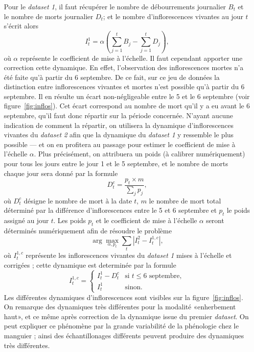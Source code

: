 Pour le \emph{dataset 1}, il faut récupérer le nombre de débourrements journalier $B_t$ et le nombre de morts journalier $D_t$; et le nombre d'inflorescences vivantes au jour $t$ s'écrit alors
\[
I_t^1 = \alpha\left( \sum_{j=1}^{t} B_j - \sum_{j=1}^{t} D_j \right),
\]
où $\alpha$ représente le coefficient de mise à l'échelle.
Il faut cependant apporter une correction cette dynamique.
En effet, l'observation des inflorescences mortes n'a été faite qu'à partir du 6 septembre.
De ce fait, sur ce jeu de données la distinction entre inflorescences vivantes et mortes n'est possible qu'à partir du 6 septembre.
Il en résulte un écart non-négligeable entre le 5 et le 6 septembre (voir figure~\ref{fig:inflos}).
Cet écart correspond au nombre de mort qu'il y a eu avant le 6 septembre, qu'il faut donc répartir sur la période concernée.
N'ayant aucune indication de comment la répartir, on utilisera la dynamique d'inflorescences vivantes du \emph{dataset 2} afin que la dynamique du \emph{dataset 1} y ressemble le plus possible --- et on en profitera au passage pour estimer le coefficient de mise à l'échelle $\alpha$.
Plus précisément, on attribuera un poids (à calibrer numériquement) pour tous les jours entre le jour 1 et le 5 septembre, et le nombre de morts chaque jour sera donné par la formule
\[
D_{t}^{c} = \frac{p_t\times m}{\sum_{j}p_j},
\]
où $D_{t}^{c}$ désigne le nombre de mort à la date $t$, $m$ le nombre de mort total déterminé par la différence d'inflorescences entre le 5 et 6 septembre et $p_t$ le poids assigné au jour $t$. 
Les poids $p_t$ et le coefficient de mise à l'échelle $\alpha$ seront déterminés numériquement afin de résoudre le problème
\[
\arg\max_{\alpha, p_t} \sum_{t}\left|I^{2}_{t} - I_{t}^{1, c}\right|, 
\]
où $I_{t}^{1, c}$ représente les inflorescences vivantes du \emph{dataset 1} mises à l'échelle et corrigées ; cette dynamique est determinée par la formule
\[
I_{t}^{1, c} = \begin{cases}
                I_t^1 - D_t^{c} & \text{si } t \leq 6 \text{ septembre},\\
                I_t^1 & \text{sinon}.
               \end{cases}
\]
Les différentes dynamiques d'inflorescences sont visibles sur la figure~\ref{fig:inflos}.
On remarque des dynamiques très différentes pour la modalité «enherbement haut», et ce même après correction de la dynamique issue du premier \emph{dataset}.
On peut expliquer ce phénomène par la grande variabilité de la phénologie chez le manguier ; ainsi des échantillonages différents peuvent produire des dynamiques très différentes.
